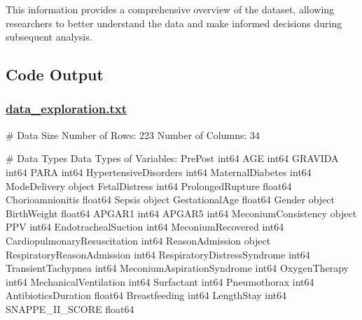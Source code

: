 \documentclass[11pt]{article}
\begin{document}
This information provides a comprehensive overview of the dataset, allowing researchers to better understand the data and make informed decisions during subsequent analysis.

\subsection{Code Output}\hypertarget{file-data-exploration-txt}{}

\subsubsection*{\hyperlink{code-Data Exploration-data-exploration-txt}{data\_exploration.txt}}

\begin{codeoutput}
\# Data Size
Number of Rows: 223
Number of Columns: 34

\# Data Types
Data Types of Variables:
PrePost                           int64
AGE                               int64
GRAVIDA                           int64
PARA                              int64
HypertensiveDisorders             int64
MaternalDiabetes                  int64
ModeDelivery                     object
FetalDistress                     int64
ProlongedRupture                float64
Chorioamnionitis                float64
Sepsis                           object
GestationalAge                  float64
Gender                           object
BirthWeight                     float64
APGAR1                            int64
APGAR5                            int64
MeconiumConsistency              object
PPV                               int64
EndotrachealSuction               int64
MeconiumRecovered                 int64
CardiopulmonaryResuscitation      int64
ReasonAdmission                  object
RespiratoryReasonAdmission        int64
RespiratoryDistressSyndrome       int64
TransientTachypnea                int64
MeconiumAspirationSyndrome        int64
OxygenTherapy                     int64
MechanicalVentilation             int64
Surfactant                        int64
Pneumothorax                      int64
AntibioticsDuration             float64
Breastfeeding                     int64
LengthStay                        int64
SNAPPE\_II\_SCORE                 float64


\end{codeoutput}
\end{document}
